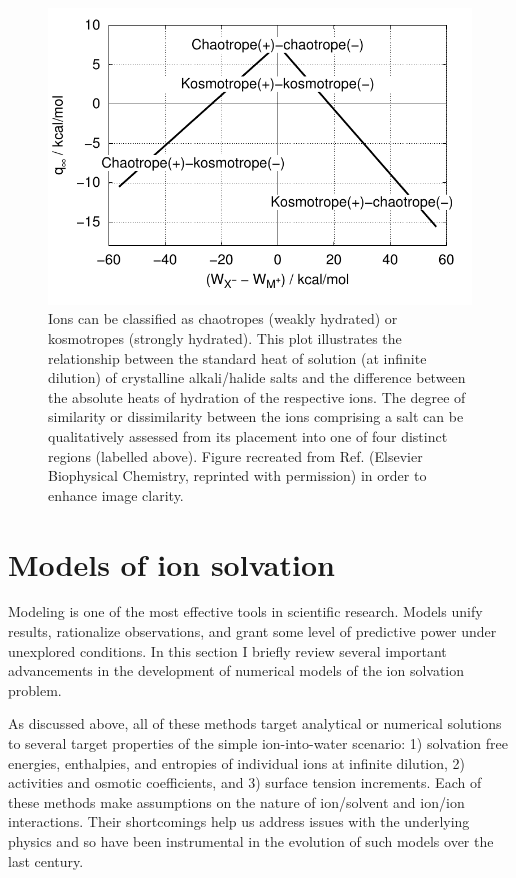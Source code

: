 \begin{intro}
\begin{figure}
 \begin{center}
  \includegraphics[width=0.98\linewidth]{images/volcano_collins.pdf}
 \end{center}
 \caption[Collins' volcano plot to distinguish similar and dissimilar ion pairs]{\label{fig:collinsvolcano}Ions can be classified as chaotropes (weakly hydrated) or
 kosmotropes (strongly hydrated). This plot illustrates the relationship between the standard heat of solution (at infinite dilution) of crystalline alkali/halide salts and 
 the difference between the absolute heats of hydration of the respective ions. The degree of similarity or dissimilarity between the ions comprising a salt can be qualitatively 
 assessed from its placement into one of four distinct regions (labelled above). Figure recreated from Ref. \cite{collins2007review} (\textcopyright Elsevier Biophysical Chemistry, 
 reprinted with permission) in order to enhance image clarity.}
\end{figure}    

  \section{\label{ch1:sec2:level1}Models of ion solvation}
   Modeling is one of the most effective tools in scientific research. Models unify results, rationalize observations, and grant some level of predictive power under unexplored
   conditions. In this section I briefly review several important advancements in the development of numerical models of the ion solvation problem. 
   
   As discussed above, all of these methods target analytical or numerical solutions to several target properties of the simple ion-into-water scenario: 1) solvation free energies, 
   enthalpies, and entropies of individual ions at infinite dilution, 2) activities and osmotic coefficients, and 3) surface tension increments. Each of these methods make assumptions
   on the nature of ion/solvent and ion/ion interactions. Their shortcomings help us address issues with the underlying physics and so have been instrumental in the evolution of 
   such models over the last century. 
   

\end{intro}
